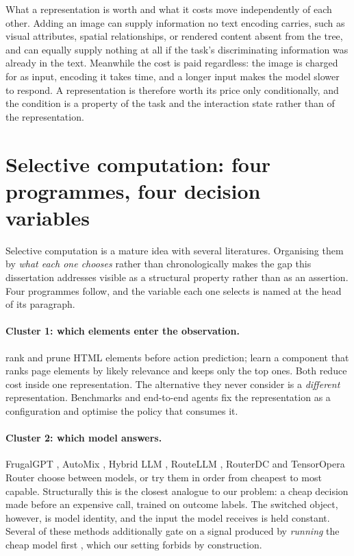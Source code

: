 What a representation is worth and what it costs move independently of each
other. Adding an image can supply information no text encoding carries, such as visual attributes, spatial relationships, or rendered content absent from the tree, and can equally supply nothing at all if the
task's discriminating information was already in the text. Meanwhile the cost
is paid regardless: the image is charged for as input, encoding it takes time,
and a longer input makes the model slower to respond. A representation is therefore worth
its price only conditionally, and the condition is a property of the task and
the interaction state rather than of the representation.

\section{Selective computation: four programmes, four decision variables}
\label{sec:selective}

Selective computation is a mature idea with several literatures. Organising them
by \emph{what each one chooses} rather than chronologically makes the gap this dissertation addresses visible as a structural property rather than as
an assertion. Four programmes follow, and the variable each one selects is named
at the head of its paragraph.


\paragraph{Cluster 1: which elements enter the observation.}
\citet{deng2023mind2web} rank and prune HTML elements before action prediction;
\citet{lu2024weblinx} learn a component that ranks page elements by likely
relevance and keeps only the top ones. Both
reduce cost inside one representation. The alternative they never consider is a
\emph{different} representation. Benchmarks \citep{zhou2024webarena,
koh2024visualwebarena} and end-to-end agents \citep{he2024webvoyager,
zheng2024gpt4v} fix the representation as a configuration and optimise the
policy that consumes it.

\paragraph{Cluster 2: which model answers.} FrugalGPT \citep{chen2024frugalgpt},
AutoMix \citep{aggarwal2024automix}, Hybrid LLM \citep{ding2024hybridllm},
RouteLLM \citep{ong2025routellm}, RouterDC \citep{chen2024routerdc} and
TensorOpera Router \citep{stripelis2024tensoropera} choose between models, or
try them in order from cheapest to most capable. Structurally this is the closest analogue to our problem:
a cheap decision made before an expensive call, trained on outcome labels.
The switched object, however, is model identity, and the input the model
receives is held constant. Several of these methods additionally gate on a
signal produced by \emph{running} the cheap model first
\citep{chen2024frugalgpt, aggarwal2024automix}, which our setting forbids by
construction.

